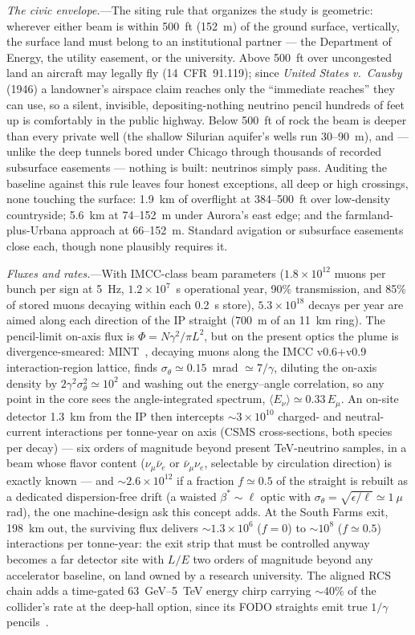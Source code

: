 \documentclass[aps,prl,reprint,superscriptaddress,nofootinbib]{revtex4-2}
\begin{document}
\emph{The civic envelope.}---The siting rule that organizes the study is
geometric: wherever either beam is within 500~ft (152~m) of the ground
surface, vertically, the surface land must belong to an institutional
partner --- the Department of Energy, the utility easement, or the
university. Above 500~ft over uncongested land an aircraft may legally
fly (14~CFR~91.119); since \emph{United States v.\ Causby} (1946) a
landowner's airspace claim reaches only the ``immediate reaches'' they
can use, so a silent, invisible, depositing-nothing neutrino pencil
hundreds of feet up is comfortably in the public highway. Below 500~ft of
rock the beam is deeper than every private well (the shallow Silurian
aquifer's wells run 30--90~m), and --- unlike the deep tunnels bored
under Chicago through thousands of recorded subsurface
easements --- nothing is built: neutrinos simply pass. Auditing the
baseline against this rule leaves four honest exceptions, all deep or
high crossings, none touching the surface: 1.9~km of overflight at
384--500~ft over low-density countryside; 5.6~km at 74--152~m under
Aurora's east edge; and the farmland-plus-Urbana approach at 66--152~m.
Standard avigation or subsurface easements close each, though none
plausibly requires it.

\emph{Fluxes and rates.}---With IMCC-class beam parameters
($1.8\times10^{12}$ muons per bunch per sign at 5~Hz, $1.2\times10^{7}$~s
operational year, 90\% transmission, and 85\% of stored muons decaying
within each 0.2~s store), $5.3\times10^{18}$ decays per year are aimed
along each direction of the IP straight ($700$~m of an 11~km ring). The
pencil-limit on-axis flux is $\Phi = N\gamma^{2}/\pi L^{2}$, but on the
present optics the plume is divergence-smeared: MINT~\cite{MINT}, decaying
muons along the IMCC v0.6+v0.9 interaction-region lattice, finds
$\sigma_\theta \simeq 0.15$~mrad $\simeq 7/\gamma$, diluting the on-axis
density by $2\gamma^{2}\sigma_\theta^{2} \simeq 10^{2}$ and washing out
the energy--angle correlation, so any point in the core sees the
angle-integrated spectrum, $\langle E_\nu\rangle \simeq 0.33\,E_\mu$.
An on-site detector 1.3~km from the IP then intercepts
${\sim}3\times10^{10}$ charged- and neutral-current interactions per
tonne-year on axis (CSMS cross-sections, both species per decay) --- six
orders of magnitude beyond present TeV-neutrino samples, in a beam whose
flavor content ($\nu_\mu\bar\nu_e$ or $\bar\nu_\mu\nu_e$, selectable by
circulation direction) is exactly known --- and
${\sim}2.6\times10^{12}$ if a fraction $f \simeq 0.5$ of the straight is
rebuilt as a dedicated dispersion-free drift (a waisted
$\beta^{*}\!\sim\!\ell$ optic with $\sigma_\theta = \sqrt{\epsilon/\ell}
\simeq 1~\mu$rad), the one machine-design ask this concept adds. At the
South Farms exit, 198~km out, the surviving flux delivers
${\sim}1.3\times10^{6}$ ($f=0$) to ${\sim}10^{8}$ ($f\simeq0.5$)
interactions per tonne-year: the exit strip that must be controlled
anyway becomes a far detector site with $L/E$ two orders of magnitude
beyond any accelerator baseline, on land owned by a research university.
The aligned RCS chain adds a time-gated 63~GeV--5~TeV energy chirp
carrying ${\sim}40\%$ of the collider's rate at the deep-hall option,
since its FODO straights emit true $1/\gamma$ pencils~\cite{site}.
\end{document}
